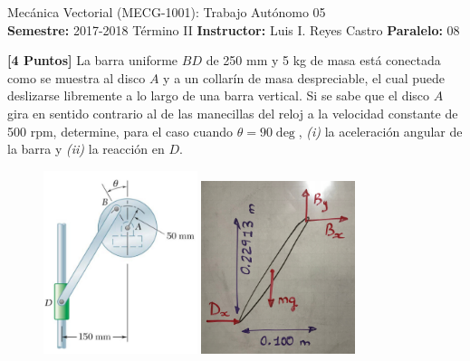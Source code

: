 \documentclass[ a4paper, twoside, 11pt]{article}
\newcommand{\numero}{05}
\begin{document}
\allowdisplaybreaks

\begin{center}
\Large Mec\'anica Vectorial (MECG-1001): Trabajo Aut\'onomo \numero \\[2ex]
\small \textbf{Semestre:} 2017-2018 T\'ermino II \qquad
\textbf{Instructor:} Luis I. Reyes Castro \qquad
\textbf{Paralelo:} 08
\end{center}
\fullskip

\begin{problem}
\textbf{[4 Puntos]} La barra uniforme $BD$ de 250 mm y 5 kg de masa est\'a conectada como se muestra al disco $A$ y a un collar\'in de masa despreciable, el cual puede deslizarse libremente a lo largo de una barra vertical. Si se sabe que el disco $A$ gira en sentido contrario al de las manecillas del reloj a la velocidad constante de 500 rpm, determine, para el caso cuando $\theta = 90\deg$, \textit{(i)} la aceleraci\'on angular de la barra y \textit{(ii)} la reacci\'on en $D$. 

\begin{figure}[htb]
\centering
\includegraphics[width=0.4\textwidth]{problema-1.jpg} \quad
\includegraphics[width=0.4\textwidth]{problema-1_DCL.jpg}
\end{figure}


\end{problem}
\end{document}
